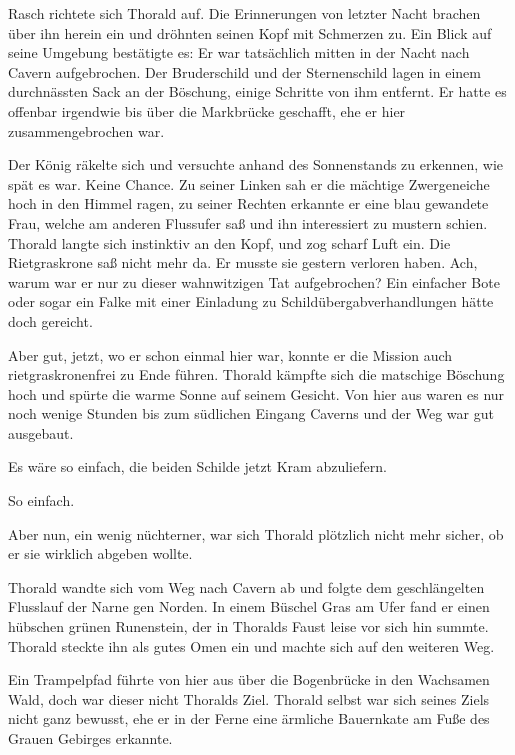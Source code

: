Rasch richtete sich Thorald auf. Die Erinnerungen von letzter Nacht brachen über ihn herein ein und dröhnten seinen Kopf mit Schmerzen zu. Ein Blick auf seine Umgebung bestätigte es: Er war tatsächlich mitten in der Nacht nach Cavern aufgebrochen. Der Bruderschild und der Sternenschild lagen in einem durchnässten Sack an der Böschung, einige Schritte von ihm entfernt. Er hatte es offenbar irgendwie bis über die Markbrücke geschafft, ehe er hier zusammengebrochen war.

Der König räkelte sich und versuchte anhand des Sonnenstands zu erkennen, wie spät es war. Keine Chance. Zu seiner Linken sah er die mächtige Zwergeneiche hoch in den Himmel ragen, zu seiner Rechten erkannte er eine blau gewandete Frau, welche am anderen Flussufer saß und ihn interessiert zu mustern schien. Thorald langte sich instinktiv an den Kopf, und zog scharf Luft ein. Die Rietgraskrone saß nicht mehr da. Er musste sie gestern verloren haben. Ach, warum war er nur zu dieser wahnwitzigen Tat aufgebrochen? Ein einfacher Bote oder sogar ein Falke mit einer Einladung zu Schildübergabverhandlungen hätte doch gereicht.

Aber gut, jetzt, wo er schon einmal hier war, konnte er die Mission auch rietgraskronenfrei zu Ende führen. Thorald kämpfte sich die matschige Böschung hoch und spürte die warme Sonne auf seinem Gesicht. Von hier aus waren es nur noch wenige Stunden bis zum südlichen Eingang Caverns und der Weg war gut ausgebaut.

Es wäre so einfach, die beiden Schilde jetzt Kram abzuliefern.

So einfach.

Aber nun, ein wenig nüchterner, war sich Thorald plötzlich nicht mehr sicher, ob er sie wirklich abgeben wollte.



\trennzeichen



Thorald wandte sich vom Weg nach Cavern ab und folgte dem geschlängelten Flusslauf der Narne gen Norden. In einem Büschel Gras am Ufer fand er einen hübschen grünen Runenstein, der in Thoralds Faust leise vor sich hin summte. Thorald steckte ihn als gutes Omen ein und machte sich auf den weiteren Weg.

Ein Trampelpfad führte von hier aus über die Bogenbrücke in den Wachsamen Wald, doch war dieser nicht Thoralds Ziel. Thorald selbst war sich seines Ziels nicht ganz bewusst, ehe er in der Ferne eine ärmliche Bauernkate am Fuße des Grauen Gebirges erkannte.

